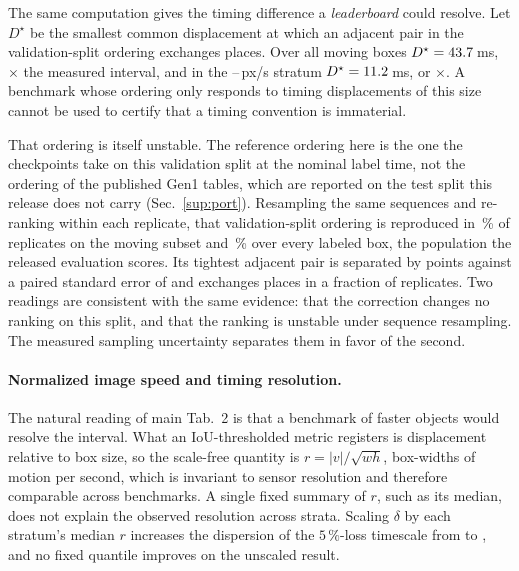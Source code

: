 \documentclass[10pt,twocolumn,letterpaper]{article}
\begin{document}
The same computation gives the timing difference a \emph{leaderboard} could resolve. Let
$D^{\star}$ be the smallest common displacement at which an adjacent pair in the
validation-split ordering exchanges places. Over all moving boxes $D^{\star}=43.7\,$ms,
\dstarAllTau$\times$ the measured interval, and in the \mapCutMid--\mapCutHi\,px/s stratum
$D^{\star}=11.2\,$ms, or \dstarMidTau$\times$. A benchmark whose ordering only responds
to timing displacements of this size cannot be used to certify that a timing convention is
immaterial.

That ordering is itself unstable. The reference ordering here is the one the \rankCkpts{}
checkpoints take on this validation split at the nominal label time, not the ordering of
the published Gen1 tables, which are reported on the test split this release does not carry
(Sec.~\ref{sup:port}). Resampling the same \outSeqsScanned{} sequences and re-ranking
within each replicate, that validation-split ordering is reproduced in \rankHoldMov\,\% of
replicates on the moving subset and \rankHoldBox\,\% over every labeled box, the population
the released evaluation scores. Its tightest
adjacent pair is separated by \rankGapMin{} points against a paired standard error of
\rankGapMinSE{} and exchanges places in a fraction \rankFlipMax{} of replicates. Two
readings are consistent with the same evidence: that the correction changes no ranking on
this split, and that the ranking is unstable under sequence resampling. The measured
sampling uncertainty separates them in favor of the second.

\paragraph{Normalized image speed and timing resolution.} The natural reading of
main Tab.~2 is that a benchmark of faster objects would resolve the interval. What an
IoU-thresholded metric registers is displacement relative to box size, so the scale-free
quantity is $r = |v| / \sqrt{wh}$, box-widths of motion per second, which is invariant to
sensor resolution and therefore comparable across benchmarks. A single fixed summary of $r$,
such as its median, does not explain the observed resolution across strata. Scaling $\delta$ by
each stratum's median $r$ increases the dispersion of the $5\,\%$-loss timescale from
\collapseCVraw{} to \collapseCVmed{}, and no fixed quantile improves on the unscaled result.
\end{document}
